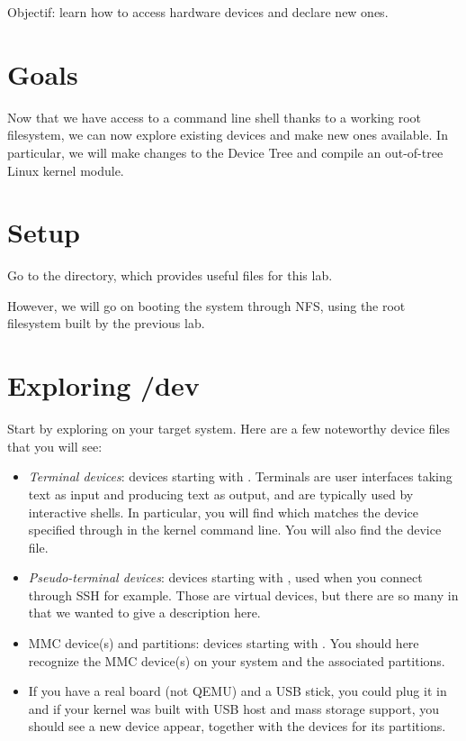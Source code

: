 {Objectif: learn how to access hardware devices and declare new ones.}

\section{Goals}

Now that we have access to a command line shell thanks to a working root
filesystem, we can now explore existing devices and make new ones
available. In particular, we will make changes to the Device Tree
and compile an out-of-tree Linux kernel module.

\section{Setup}

Go to the  directory,
which provides useful files for this lab.

However, we will go on booting the system through NFS, using the
root filesystem built by the previous lab.

\section{Exploring /dev}

Start by exploring  on your target system. Here are a few
noteworthy device files that you will see:

\begin{itemize}
 \item {\em Terminal devices}: devices starting with .
       Terminals are user interfaces taking text as
       input and producing text as output, and are typically used by
       interactive shells. In particular, you will find
        which matches the device specified through
        in the kernel command line. You will also find
       the {\tt \ttyname} device file.
 \item {\em Pseudo-terminal devices}: devices starting with ,
       used when you connect through SSH for example. Those are virtual
       devices, but there are so many in  that we wanted
       to give a description here.
 \item {MMC device(s) and partitions}: devices starting with
       . You should here recognize the MMC device(s)
       on your system and the associated partitions.
 \item If you have a real board (not QEMU) and a USB stick, you could
       plug it in and if your kernel was built with USB host and mass
       storage support, you should see a new  device appear,
       together with the  devices for its partitions.
\end{itemize}


